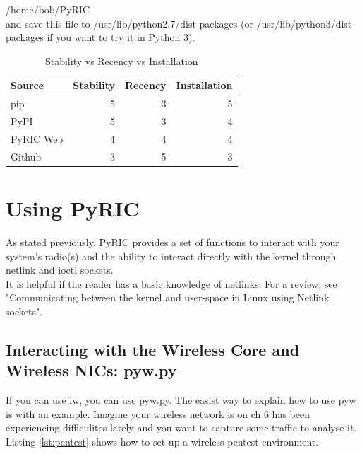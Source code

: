 \documentclass[11pt]{article}
\begin{document}
    /home/bob/PyRIC \\

and save this file to /usr/lib/python2.7/dist-packages (or 
/usr/lib/python3/dist-packages if you want to try it in Python 3).

\begin{table}
\begin{center}
\begin{tabular}{| l | r | r | r | }
\hline
Source & Stability & Recency & Installation \\
\hline
pip & 5 & 3 & 5\\
\hline
PyPI & 5 & 3 & 4\\
\hline
PyRIC Web & 4 & 4 & 4\\
\hline
Github & 3 & 5 & 3\\
\hline
\end{tabular}
\caption{Stability vs Recency vs Installation}
\end{center}
\label{tab:install}
\end{table}

\section{Using PyRIC}\label{sec:using}
As stated previously, PyRIC provides a set of functions to interact with your 
system's radio(s) and the ability to interact directly with the kernel through
netlink and ioctl sockets. \\

It is helpful if the reader has a basic knowledge of netlinks. For a review, see "Communicating between the kernel and user-space in Linux using Netlink sockets". 

\subsection{Interacting with the Wireless Core and Wireless NICs: pyw.py}
If you can use iw, you can use pyw.py. The easist way to explain how to use pyw 
is with an example. Imagine your wireless network is on ch 6 has been experiencing 
difficulites lately and you want to capture some traffic to analyse it. Listing 
\ref{lst:pentest} shows how to set up a wireless pentest environment. \\
\end{document}
